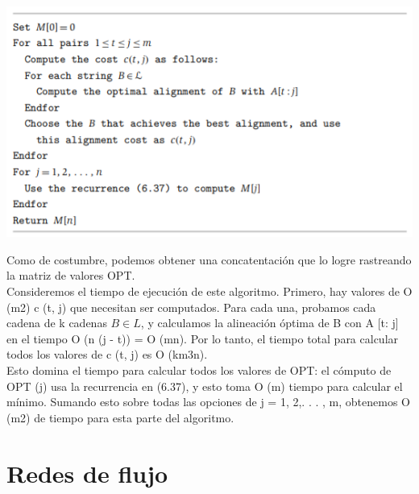 \documentclass[a4paper, 12pt]{book}
\theoremstyle{dotless}
\begin{document}
\includegraphics[scale=1]{Imagenes-Seccion6/cod6_19.PNG}

Como de costumbre, podemos obtener una concatentación que lo logre rastreando la matriz de valores OPT.\\

Consideremos el tiempo de ejecución de este algoritmo. Primero, hay valores de O (m2) c (t, j) que necesitan ser computados. Para cada una, probamos cada cadena de k cadenas $B  \in  L$, y calculamos la alineación óptima de B con A [t: j] en el tiempo O (n (j - t)) = O (mn). Por lo tanto, el tiempo total para calcular todos los valores de c (t, j) es O (km3n).\\

Esto domina el tiempo para calcular todos los valores de OPT: el cómputo de OPT (j) usa la recurrencia en (6.37), y esto toma O (m) tiempo para calcular el mínimo. Sumando esto sobre todas las opciones de j = 1, 2,. . . , m, obtenemos O (m2) de tiempo para esta parte del algoritmo.\\



\chapter{Redes de flujo}

\end{document}
